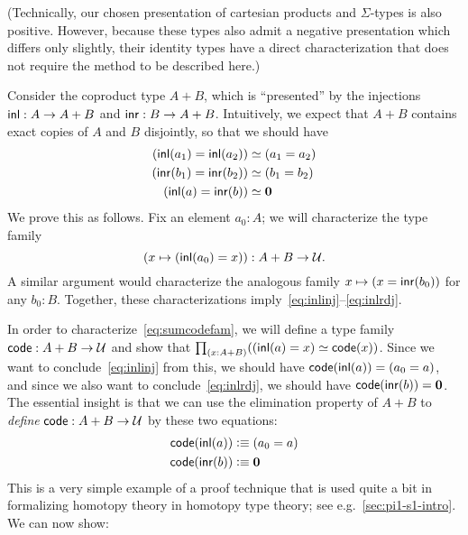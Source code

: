 (Technically, our chosen presentation of cartesian products and $\Sigma$-types is also positive.
However, because these types also admit a negative presentation which differs only slightly, their identity types have a direct characterization that does not require the method to be described here.)

Consider the coproduct type $A+B$, which is ``presented'' by the injections ${\mathsf{inl}}:A\to A+B$ and ${\mathsf{inr}}:B\to A+B$.
Intuitively, we expect that $A+B$ contains exact copies of $A$ and $B$ disjointly, so that we should have
\begin{align}
  {(\inl(a_1)=\inl(a_2))}&\eqvsym {(a_1=a_2)} \label{eq:inlinj}\\
  {(\inr(b_1)=\inr(b_2))}&\eqvsym {(b_1=b_2)}\\
  {(\inl(a)= \inr(b))} &\eqvsym {\emptyt} \label{eq:inlrdj}
\end{align}
We prove this as follows.
Fix an element $a_0:A$; we will characterize the type family
\begin{equation}
  (x\mapsto (\inl(a_0)=x)) : A+B \to \type.\label{eq:sumcodefam}
\end{equation}
A similar argument would characterize the analogous family $x\mapsto (x = {\mathsf{inr}}(b_0))$ for any $b_0:B$.
Together, these characterizations imply~\eqref{eq:inlinj}--\eqref{eq:inlrdj}.

In order to characterize~\eqref{eq:sumcodefam}, we will define a type family $\mathsf{code}:A+B\to\mathcal{U}$ and show that $\prd{x:A+B} (\eqv{(\inl(a)=x)}{\code(x)})$.
Since we want to conclude~\eqref{eq:inlinj} from this, we should have $\mathsf{code}({\mathsf{inl}}(a)) = (a_0=a)$, and since we also want to conclude~\eqref{eq:inlrdj}, we should have $\mathsf{code} ({\mathsf{inr}}(b)) = \mathbf{0}$.
The essential insight is that we can use the elimination property of $A+B$ to \emph{define} $\mathsf{code}:A+B\to\mathcal{U}$ by these two equations:
\begin{align*}
  \mathsf{code}({\mathsf{inl}}(a)) &\vcentcolon\equiv (a_0=a)\\
  \mathsf{code}({\mathsf{inr}}(b)) &\vcentcolon\equiv \mathbf{0}
\end{align*}
This is a very simple example of a proof technique that is used quite a
bit in formalizing homotopy theory in homotopy type theory; see
e.g.\ \autoref{sec:pi1-s1-intro}.  
%
We can now show:

